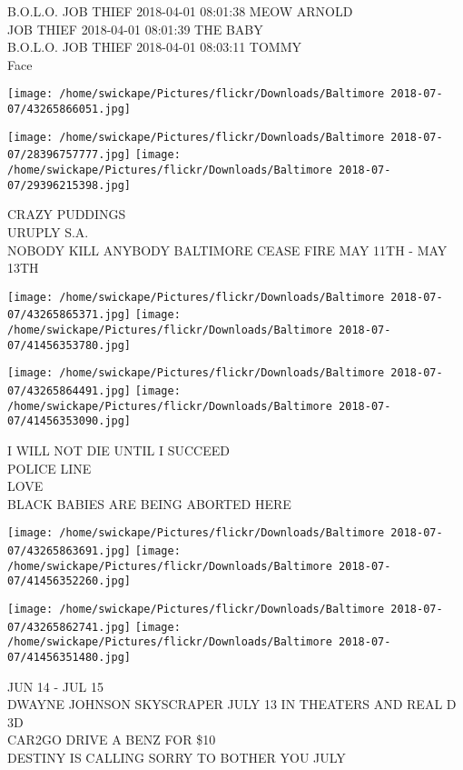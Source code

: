 \documentclass[10pt,letterpaper]{article}
\begin{document}
B.O.L.O. JOB THIEF 2018{-}04{-}01 08:01:38 MEOW ARNOLD\\
JOB THIEF 2018{-}04{-}01 08:01:39 THE BABY\\
B.O.L.O. JOB THIEF 2018{-}04{-}01 08:03:11 TOMMY\\
Face
\pagebreak

\texttt{[image: /home/swickape/Pictures/flickr/Downloads/Baltimore 2018-07-07/43265866051.jpg]}

\vspace{0.25in}
\texttt{[image: /home/swickape/Pictures/flickr/Downloads/Baltimore 2018-07-07/28396757777.jpg]}
\texttt{[image: /home/swickape/Pictures/flickr/Downloads/Baltimore 2018-07-07/29396215398.jpg]}

CRAZY PUDDINGS\\
URUPLY S.A.\\
NOBODY KILL ANYBODY BALTIMORE CEASE FIRE MAY 11TH {-} MAY 13TH
\pagebreak

\texttt{[image: /home/swickape/Pictures/flickr/Downloads/Baltimore 2018-07-07/43265865371.jpg]}
\texttt{[image: /home/swickape/Pictures/flickr/Downloads/Baltimore 2018-07-07/41456353780.jpg]}

\texttt{[image: /home/swickape/Pictures/flickr/Downloads/Baltimore 2018-07-07/43265864491.jpg]}
\texttt{[image: /home/swickape/Pictures/flickr/Downloads/Baltimore 2018-07-07/41456353090.jpg]}

I WILL NOT DIE UNTIL I SUCCEED\\
POLICE LINE\\
LOVE\\
BLACK BABIES ARE BEING ABORTED HERE
\pagebreak

\texttt{[image: /home/swickape/Pictures/flickr/Downloads/Baltimore 2018-07-07/43265863691.jpg]}
\texttt{[image: /home/swickape/Pictures/flickr/Downloads/Baltimore 2018-07-07/41456352260.jpg]}

\texttt{[image: /home/swickape/Pictures/flickr/Downloads/Baltimore 2018-07-07/43265862741.jpg]}
\texttt{[image: /home/swickape/Pictures/flickr/Downloads/Baltimore 2018-07-07/41456351480.jpg]}

JUN 14 {-} JUL 15\\
DWAYNE JOHNSON SKYSCRAPER JULY 13 IN THEATERS AND REAL D 3D\\
CAR2GO DRIVE A BENZ FOR \$10\\
DESTINY IS CALLING SORRY TO BOTHER YOU JULY
\pagebreak
\end{document}
